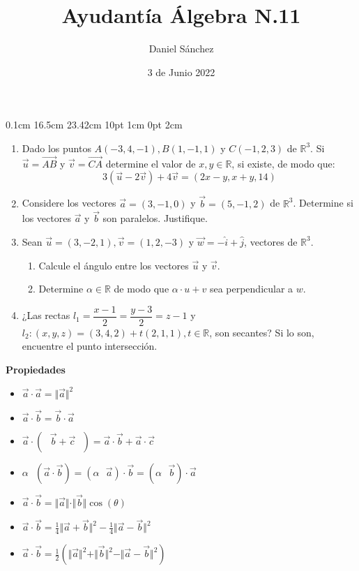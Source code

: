 \documentclass[12pt]{article}
\begin{document}
\setmargins{2.5cm}
{0.1cm}
{16.5cm}
{23.42cm}
{10pt}
{1cm}
{0pt}
{2cm}

\title{Ayudant\'ia \'Algebra N.11}
\date{3 de Junio 2022}
\author{Daniel S\'anchez}
\maketitle

\begin{enumerate}
      \item Dado los puntos $A(-3,4,-1),B(1,-1,1)$ y $C(-1,2,3)$ de $\mathbb{R}^3$. Si $\vec{u}=\Vec{AB}$ y $\vec{v}=\vec{CA}$ determine el valor de $x,y \in \mathbb{R}$, si existe, de modo que: $$3(\vec{u}-2\vec{v})+4\vec{v}=(2x-y,x+y,14)$$
      \item Considere los vectores $\vec{a}=(3,-1,0)$ y $\vec{b}=(5,-1,2)$ de $\mathbb{R}^3$. Determine si los vectores $\vec{a}$ y $\vec{b}$ son paralelos. Justifique.
      \item Sean $\vec{u}=(3,-2,1),\vec{v}=(1,2,-3)$ y $\vec{w}= -\hat{i}+\hat{j}$, vectores de $\mathbb{R}^3$.
            \begin{enumerate}
                  \item Calcule el ángulo entre los vectores $\vec{u}$ y $\vec{v}$.
                  \item Determine $\alpha \in \mathbb{R}$ de modo que $\alpha \cdot u + v$ sea perpendicular a $w$.
            \end{enumerate}
      \item ¿Las rectas $l_1 = \dfrac{x-1}{2}=\dfrac{y-3}{2}=z-1$ y $l_2:(x,y,z)=(3,4,2)+t(2,1,1), t \in \mathbb{R}$, son secantes? Si lo son, encuentre el punto intersección.
            
\end{enumerate}
\pagebreak
\textbf{Propiedades}

\begin{itemize}
      \item $\vec{a} \cdot \vec{a} = \Vert \vec{a} \Vert ^2$
      \item $\vec{a} \cdot \vec{b} = \vec{b} \cdot \vec{a}$
      \item $\vec{a} \cdot (\mbox{ }\vec{b} + \vec{c}\mbox{ }) = \vec{a} \cdot \vec{b} + \vec{a} \cdot \vec{c}$
      \item $\alpha \mbox{ }(\vec{a}\cdot \vec{b}) = (\alpha \mbox{ }\vec{a})\cdot \vec{b} = (\alpha \mbox{ }\vec{b})\cdot \vec{a}$
      \item $\vec{a} \cdot \vec{b} = \Vert \vec{a} \Vert \cdot \Vert \vec{b} \Vert \cos({\theta})$
      \item $\vec{a}\cdot \vec{b} = \frac{1}{4}\Vert \vec{a} + \vec{b}\Vert ^2 - \frac{1}{4}\Vert \vec{a} - \vec{b}\Vert ^2$
      \item $\vec{a}\cdot \vec{b} = \frac{1}{2}(\Vert \vec{a} \Vert ^2 + \Vert \vec{b} \Vert ^2 - \Vert \vec{a} - \vec{b}\Vert ^2)$
\end{itemize}
\end{document}
